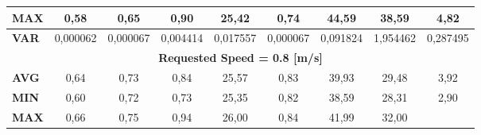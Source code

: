 \begin{landscape}
\begin{table}[H]
{\begin{tabular}{lcccccccc}
\multicolumn{1}{|l|}{\textbf{MAX}} &
  \multicolumn{1}{c|}{{\color[HTML]{595959} 0,58}} &
  \multicolumn{1}{c|}{{\color[HTML]{595959} 0,65}} &
  \multicolumn{1}{c|}{{\color[HTML]{595959} 0,90}} &
  \multicolumn{1}{c|}{{\color[HTML]{595959} 25,42}} &
  \multicolumn{1}{c|}{{\color[HTML]{595959} 0,74}} &
  \multicolumn{1}{c|}{{\color[HTML]{595959} 44,59}} &
  \multicolumn{1}{c|}{{\color[HTML]{595959} 38,59}} &
  \multicolumn{1}{c|}{{\color[HTML]{595959} 4,82}} \\ \hline
\multicolumn{1}{|l|}{\textbf{VAR}} &
  \multicolumn{1}{c|}{{\color[HTML]{595959} 0,000062}} &
  \multicolumn{1}{c|}{{\color[HTML]{595959} 0,000067}} &
  \multicolumn{1}{c|}{{\color[HTML]{595959} 0,004414}} &
  \multicolumn{1}{c|}{{\color[HTML]{595959} 0,017557}} &
  \multicolumn{1}{c|}{{\color[HTML]{595959} 0,000067}} &
  \multicolumn{1}{c|}{{\color[HTML]{595959} 0,091824}} &
  \multicolumn{1}{c|}{{\color[HTML]{595959} 1,954462}} &
  \multicolumn{1}{c|}{{\color[HTML]{595959} 0,287495}} \\ \hline
\multicolumn{9}{|c|}{\textbf{Requested Speed = 0.8 {[}m/s{]}}} \\ \hline
\multicolumn{1}{|l|}{\textbf{AVG}} &
  \multicolumn{1}{c|}{{\color[HTML]{595959} 0,64}} &
  \multicolumn{1}{c|}{{\color[HTML]{595959} 0,73}} &
  \multicolumn{1}{c|}{{\color[HTML]{595959} 0,84}} &
  \multicolumn{1}{c|}{{\color[HTML]{595959} 25,57}} &
  \multicolumn{1}{c|}{{\color[HTML]{595959} 0,83}} &
  \multicolumn{1}{c|}{{\color[HTML]{595959} 39,93}} &
  \multicolumn{1}{c|}{{\color[HTML]{595959} 29,48}} &
  \multicolumn{1}{c|}{{\color[HTML]{595959} 3,92}} \\ \hline
\multicolumn{1}{|l|}{\textbf{MIN}} &
  \multicolumn{1}{c|}{{\color[HTML]{595959} 0,60}} &
  \multicolumn{1}{c|}{{\color[HTML]{595959} 0,72}} &
  \multicolumn{1}{c|}{{\color[HTML]{595959} 0,73}} &
  \multicolumn{1}{c|}{{\color[HTML]{595959} 25,35}} &
  \multicolumn{1}{c|}{{\color[HTML]{595959} 0,82}} &
  \multicolumn{1}{c|}{{\color[HTML]{595959} 38,59}} &
  \multicolumn{1}{c|}{{\color[HTML]{595959} 28,31}} &
  \multicolumn{1}{c|}{{\color[HTML]{595959} 2,90}} \\ \hline
\multicolumn{1}{|l|}{\textbf{MAX}} &
  \multicolumn{1}{c|}{{\color[HTML]{595959} 0,66}} &
  \multicolumn{1}{c|}{{\color[HTML]{595959} 0,75}} &
  \multicolumn{1}{c|}{{\color[HTML]{595959} 0,94}} &
  \multicolumn{1}{c|}{{\color[HTML]{595959} 26,00}} &
  \multicolumn{1}{c|}{{\color[HTML]{595959} 0,84}} &
  \multicolumn{1}{c|}{{\color[HTML]{595959} 41,99}} &
  \multicolumn{1}{c|}{{\color[HTML]{595959} 32,00}} &

\end{tabular}}
\end{table}
\end{landscape}
